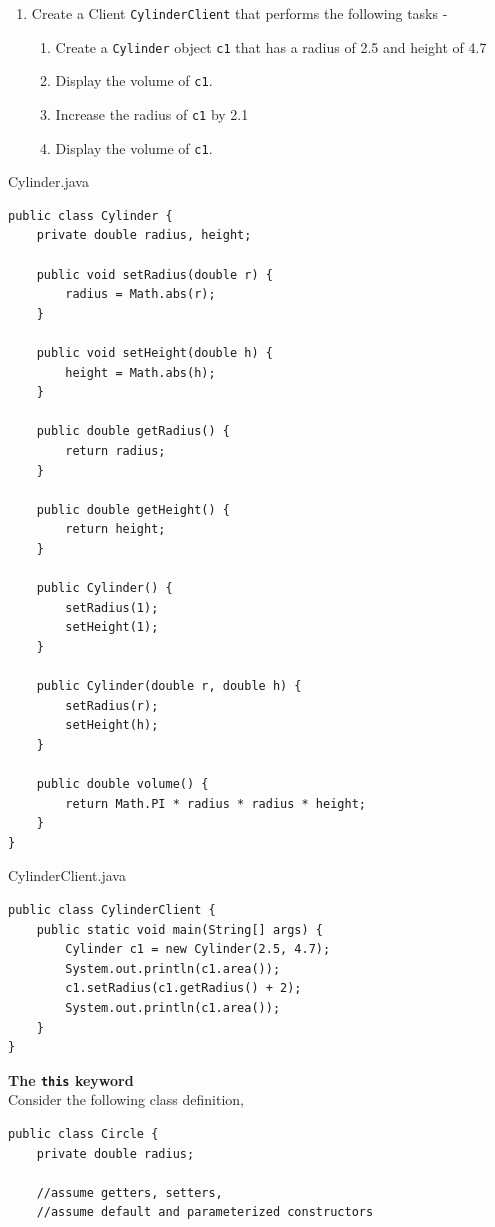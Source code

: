 \begin{questions}
\begin{enumerate}
\item Create a Client \texttt{CylinderClient} that performs the following tasks -

	\begin{enumerate}
	\item Create a \texttt{Cylinder} object \texttt{c1} that has a radius of 2.5 and height of 4.7
	\item Display the volume of \texttt{c1}.
	\item Increase the radius of \texttt{c1} by 2.1
	\item Display the volume of \texttt{c1}.
	\end{enumerate}
	
\end{enumerate}
\begin{solution}
\newpage

Cylinder.java
\begin{lstlisting}
public class Cylinder {
	private double radius, height;
	
	public void setRadius(double r) {
		radius = Math.abs(r);
	}
	
	public void setHeight(double h) {
		height = Math.abs(h);
	}
	
	public double getRadius() {
		return radius;
	}
	
	public double getHeight() {
		return height;
	}
	
	public Cylinder() {
		setRadius(1);
		setHeight(1);
	}
	
	public Cylinder(double r, double h) {
		setRadius(r);
		setHeight(h);
	}
	
	public double volume() {
		return Math.PI * radius * radius * height;
	}		
}
\end{lstlisting}

CylinderClient.java
\begin{lstlisting}
public class CylinderClient {
	public static void main(String[] args) {
		Cylinder c1 = new Cylinder(2.5, 4.7);
		System.out.println(c1.area());
		c1.setRadius(c1.getRadius() + 2);
		System.out.println(c1.area());
	}
}
\end{lstlisting}
\end{solution}

\question \textbf{The \texttt{this} keyword}\\
Consider the following class definition,

\begin{lstlisting}
public class Circle {
	private double radius;
	
	//assume getters, setters, 
	//assume default and parameterized constructors
	

\end{lstlisting}
\end{questions}
